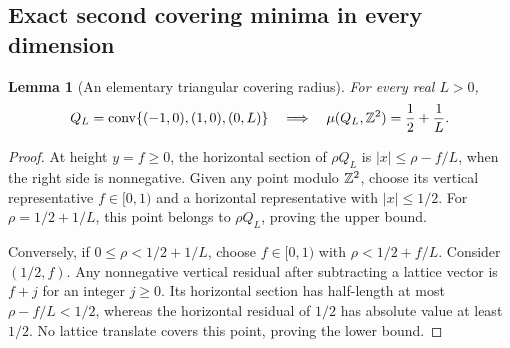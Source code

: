 \documentclass[11pt,a4paper]{article}
\newtheorem{lemma}[theorem]{Lemma}
\theoremstyle{remark}\newtheorem{remark}[theorem]{Remark}
\DeclareMathOperator{\conv}{conv}
\begin{document}
\subsection{Exact second covering minima in every dimension}
\label{rr:sec:exact}

\begin{lemma}[An elementary triangular covering radius]
\label{rr:lem:QL}
For every real $L>0$,
\[
 Q_L=\conv\{(-1,0),(1,0),(0,L)\}
 \quad\Longrightarrow\quad
 \mu(Q_L,\Z^2)=\frac12+\frac1L.
\]
\end{lemma}
\begin{proof}
At height $y=f\ge0$, the horizontal section of $\rho Q_L$ is
$|x|\le\rho-f/L$, when the right side is nonnegative.
Given any point modulo $\mathbb Z^2$, choose its vertical representative
$f\in[0,1)$ and a horizontal representative with $|x|\le1/2$.
For $\rho=1/2+1/L$, this point belongs to $\rho Q_L$, proving
the upper bound.

Conversely, if $0\le\rho<1/2+1/L$, choose $f\in[0,1)$ with
$\rho<1/2+f/L$.  Consider $(1/2,f)$.  Any nonnegative vertical
residual after subtracting a lattice vector is $f+j$ for an
integer $j\ge0$.  Its horizontal section has half-length at most
$\rho-f/L<1/2$, whereas the horizontal residual of $1/2$ has
absolute value at least $1/2$.  No lattice translate covers this
point, proving the lower bound.
\end{proof}
\end{document}
